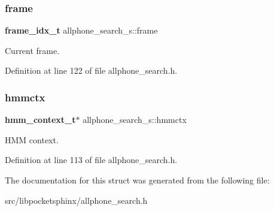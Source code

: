 \subsubsection{frame}
{\footnotesize\ttfamily \textbf{ frame\+\_\+idx\+\_\+t} allphone\+\_\+search\+\_\+s\+::frame}



Current frame. 



Definition at line 122 of file allphone\+\_\+search.\+h.

\mbox{\label{structallphone__search__s_aa82fce72da16af69af92aeca29beed3d}} 
\subsubsection{hmmctx}
{\footnotesize\ttfamily \textbf{ hmm\+\_\+context\+\_\+t}$\ast$ allphone\+\_\+search\+\_\+s\+::hmmctx}



H\+MM context. 



Definition at line 113 of file allphone\+\_\+search.\+h.



The documentation for this struct was generated from the following file\+:\begin{DoxyCompactItemize}
\item 
src/libpocketsphinx/allphone\+\_\+search.\+h\end{DoxyCompactItemize}
